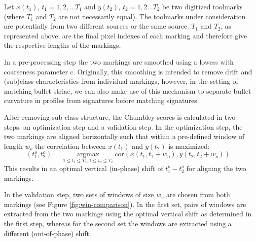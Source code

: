 \documentclass[12pt]{article}
\begin{document}
Let \(x(t_1)\), \(t_1 = 1,2,...T_1\) and \(y(t_2)\), \(t_2 = 1,2...T_2\)
be two digitized toolmarks (where \(T_1\) and \(T_2\) are not
necessarily equal). The toolmarks under consideration are potentially
from two different sources or the same source. \(T_1\) and \(T_2\), as
represented above, are the final pixel indexes of each marking and
therefore give the respective lengths of the markings.

In a pre-processing step the two markings are smoothed using a lowess
\citep{lowess} with coarseness parameter \(c\). Originally, this
smoothing is intended to remove drift and (sub)class characteristics
from individual markings, however, in the setting of matching bullet
striae, we can also make use of this mechanism to separate bullet
curvature in profiles from signatures before matching signatures.

After removing sub-class structure, the Chumbley scores is calculated in
two steps: an optimization step and a validation step. In the
optimization step, the two markings are aligned horizontally such that
within a pre-defined window of length \(w_o\) the correlation between
\(x(t_1)\) and \(y(t_2)\) is maximized: \[
\left(t_1^o, t_2^o\right) = \mathop{\arg \max}\limits_{1 \le t_1 \le T_1, 1 \le t_2 \le T_2} \text{cor} \left(x (t_1, t_1 + w_o), y(t_2, t_2 + w_o) \right)
\] This results in an optimal vertical (in-phase) shift of
\(t_1^o - t_2^o\) for aligning the two markings.

In the validation step, two sets of windows of size \(w_v\) are chosen
from both markings (see Figure \ref{fig:win-comparison}). In the first
set, pairs of windows are extracted from the two markings using the
optimal vertical shift as determined in the first step, whereas for the
second set the windows are extracted using a different (out-of-phase)
shift.
\end{document}
